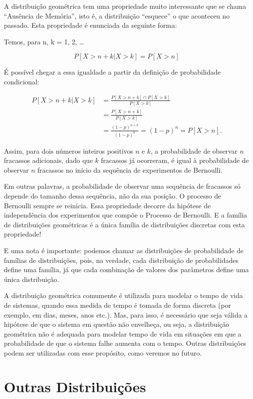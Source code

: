 \documentclass[
]{book}
\theoremstyle{definition}
\theoremstyle{definition}
\theoremstyle{definition}
\theoremstyle{remark}
\begin{document}
A distribuição geométrica tem uma propriedade muito interessante que se chama ``Ausência de Memória'', isto é, a distribuição ``esquece'' o que aconteceu no passado. Esta propriedade é enunciada da seguinte forma:

Temos, para n, k = 1, 2, \ldots{}

\[P[X > n+k |X> k] = P[X > n]\]

É possível chegar a essa igualdade a partir da definição de probabilidade condicional:

\begin{align*}
  P[X > n+k |X > k] &= \frac{P[X > n+k] \cap P[X > k]}{P[X > k]}\\
                    &= \frac{P[X > n+k]}{P[X > k]}\\
                    &= \frac{(1-p)^{n+k}}{(1-p)^k} = (1-p)^n = P[X > n].
\end{align*}

Assim, para dois números inteiros positivos \(n\) e \(k\), a probabilidade de observar \(n\) fracassos adicionais, dado que \(k\) fracassos já ocorreram, é igual à probabilidade de observar \(n\) fracassos no início da sequência de experimentos de Bernoulli.

Em outras palavras, a probabilidade de observar uma sequência de fracassos só depende do tamanho dessa sequência, não da sua posição. O processo de Bernoulli sempre se reinicia. Essa propriedade decorre da hipótese de independência dos experimentos que compõe o Processo de Bernoulli. E a família de distribuições geométricas é a única família de distribuições discretas com esta propriedade!

E uma nota é importante: podemos chamar as distribuições de probabilidade de famílias de distribuições, pois, na verdade, cada distribuição de probabilidades define uma família, já que cada combinação de valores dos parâmetros define uma única distribuição.

A distribuição geométrica comumente é utilizada para modelar o tempo de vida de sistemas, quando essa medida de tempo é tomada de forma discreta (por exemplo, em dias, meses, anos etc.). Mas, para isso, é necessário que seja válida a hipótese de que o sistema em questão não envelheça, ou seja, a distribuição geométrica não é adequada para modelar tempo de vida em situações em que a probabilidade de que o sistema falhe aumenta com o tempo. Outras distribuições podem ser utilizadas com esse propósito, como veremos no futuro.

\hypertarget{outras-distribuiuxe7uxf5es}{%
\section{Outras Distribuições}\label{outras-distribuiuxe7uxf5es}}
\end{document}
